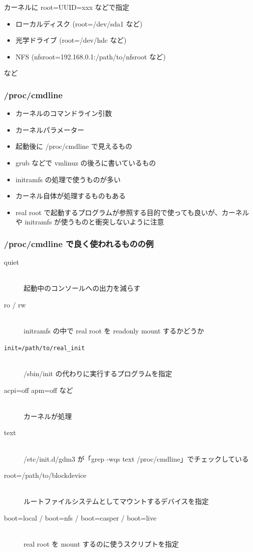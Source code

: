 \documentclass[mingoth,a4paper]{jsarticle}
\begin{document}
  カーネルに root=UUID=xxx などで指定
\begin{itemize}
\item ローカルディスク (root=/dev/sda1 など)
\item 光学ドライブ (root=/dev/hdc など)
\item NFS (nfsroot=192.168.0.1:/path/to/nfsroot など)
\end{itemize}
  など

\subsubsection{/proc/cmdline}

\begin{itemize}
\item カーネルのコマンドライン引数
\item カーネルパラメーター
\item 起動後に /proc/cmdline で見えるもの
\item grub などで vmlinuz の後ろに書いているもの
\item initramfs の処理で使うものが多い
\item カーネル自体が処理するものもある
\item real root で起動するプログラムが参照する目的で使っても良いが、カーネルや initramfs が使うものと衝突しないように注意
\end{itemize}
\subsubsection{/proc/cmdline で良く使われるものの例}

\begin{description}
      \item [quiet] 　\\起動中のコンソールへの出力を減らす
      \item [ro / rw] 　\\ initramfs の中で real root を readonly mount するかどうか
      \item [\texttt{init=/path/to/real\_init}] 　\\/sbin/init の代わりに実行するプログラムを指定
      \item [acpi=off apm=off など] 　\\カーネルが処理
      \item [text] 　\\ /etc/init.d/gdm3 が「grep -wqs text /proc/cmdline」でチェックしている
      \item [root=/path/to/blockdevice] 　\\ ルートファイルシステムとしてマウントするデバイスを指定
      \item [boot=local / boot=nfs / boot=casper / boot=live] 　\\real root を mount するのに使うスクリプトを指定
\end{description}
\end{document}
